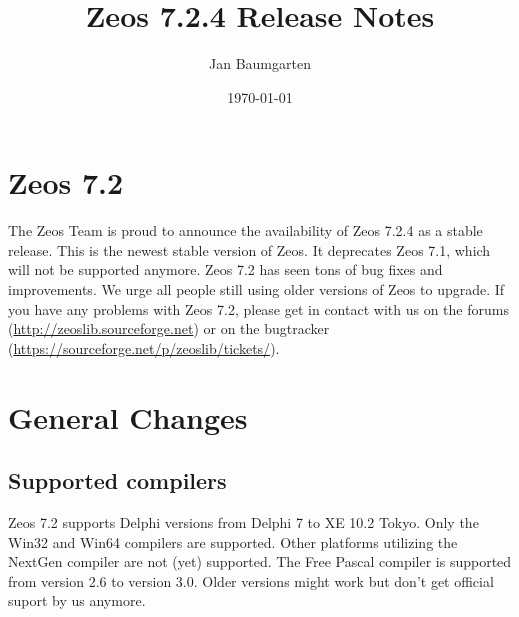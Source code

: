 \documentclass[a4paper,12pt,oneside]{article}
\title{Zeos 7.2.4 Release Notes}
\author{Jan Baumgarten}
\date{\today}
\begin{document}
\maketitle

\section{Zeos 7.2}
The Zeos Team is proud to announce the availability of Zeos 7.2.4 as a stable release.
This is the newest stable version of Zeos.
It deprecates Zeos 7.1, which will not be supported anymore.
Zeos 7.2 has seen tons of bug fixes and improvements.
We urge all people still using older versions of Zeos to upgrade.
If you have any problems with Zeos 7.2, please get in contact with us on the forums (\url{http://zeoslib.sourceforge.net}) or on the bugtracker (\url{https://sourceforge.net/p/zeoslib/tickets/}).

\section{General Changes}
\label{sec:GeneralChanges}
\subsection{Supported compilers}
\label{sec:GeneralChanges_SupportedCompilers}
Zeos 7.2 supports Delphi versions from Delphi 7 to XE 10.2 Tokyo.
Only the Win32 and Win64 compilers are supported.
Other platforms utilizing the NextGen compiler are not (yet) supported.
The Free Pascal compiler is supported from version 2.6 to version 3.0.
Older versions might work but don't get official suport by us anymore.
\end{document}
